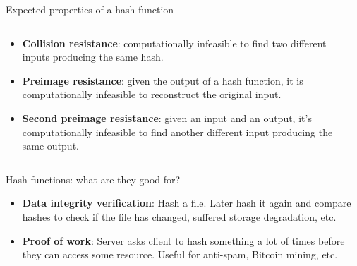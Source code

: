 \documentclass[aspectratio=169, lualatex, handout]{beamer}
\begin{document}
\begin{frame}{Expected properties of a hash function}
	\begin{columns}[c]
		\begin{column}{0.6\textwidth}
			\begin{itemize}
				\item \textbf{Collision resistance}: computationally infeasible to find
				      two different inputs producing the same hash.
				\item \textbf{Preimage resistance}: given the output of a hash function,
				      it is computationally infeasible to reconstruct the original input.
				\item \textbf{Second preimage resistance}: given an input and an output,
				      it's computationally infeasible to find another different input
				      producing the same output.
			\end{itemize}
		\end{column}
		\begin{column}{0.4\textwidth}
		\end{column}
	\end{columns}
\end{frame}

\begin{frame}{Hash functions: what are they good for?}
	\begin{itemize}[<+->]
		\item \textbf{Data integrity verification}: Hash a file. Later hash it
		      again and compare hashes to check if the file has changed, suffered storage
		      degradation, etc.
		\item \textbf{Proof of work}: Server asks client to hash something a lot of
		      times before they can access some resource. Useful for anti-spam, Bitcoin
		      mining, etc.
	\end{itemize}
\end{frame}
\end{document}
